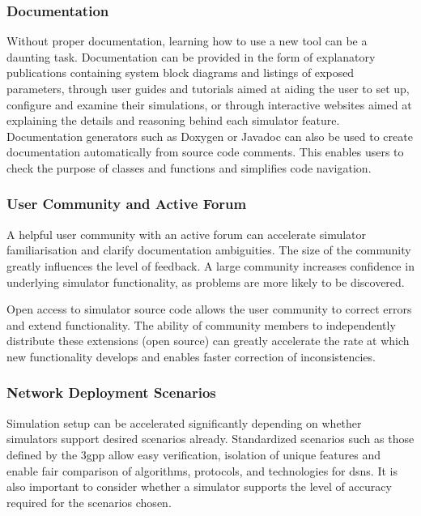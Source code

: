 \documentclass[conference]{IEEEtran}
\begin{document}
\subsubsection{Documentation}

Without proper documentation, learning how to use a new tool can be a daunting task. Documentation can be provided in the form of explanatory publications containing system block diagrams and listings of exposed parameters, through user guides and tutorials aimed at aiding the user to set up, configure and examine their simulations, or through interactive websites aimed at explaining the details and reasoning behind each simulator feature.
Documentation generators such as Doxygen or Javadoc can also be used to create documentation automatically from source code comments. This enables users to check the purpose of classes and functions and simplifies code navigation.

\subsubsection{User Community and Active Forum}
\label{subsect:user_community}

A helpful user community with an active forum can accelerate simulator familiarisation and clarify documentation ambiguities. The size of the community greatly influences the level of feedback. A large community increases confidence in underlying simulator functionality, as problems are more likely to be discovered.

Open access to simulator source code allows the user community to correct errors and extend functionality. The ability of community members to independently distribute these extensions (open source) can greatly accelerate the rate at which new functionality develops and enables faster correction of inconsistencies.

\subsubsection{Network Deployment Scenarios}\label{subsect:network_deployment_scenarios}

Simulation setup can be accelerated significantly depending on whether simulators support desired scenarios already. Standardized scenarios such as those defined by the \ac{3gpp} allow easy verification, isolation of unique features and enable fair comparison of algorithms, protocols, and technologies for \acp{dsn}. It is also important to consider whether a simulator supports the level of accuracy required for the scenarios chosen.
\end{document}
